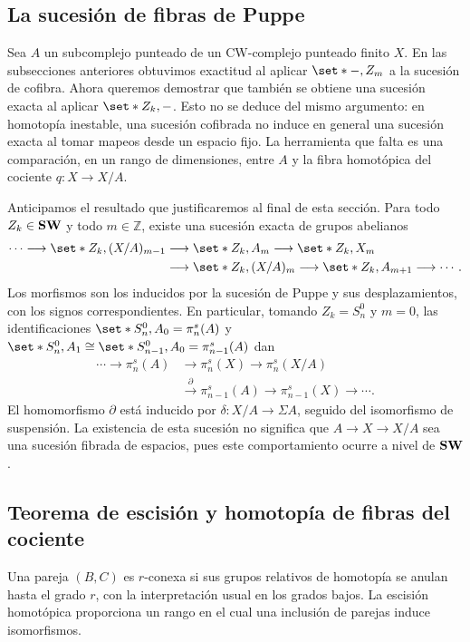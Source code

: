 \subsection{La sucesión de fibras de Puppe}
Sea $A$ un subcomplejo punteado de un CW-complejo punteado finito $X$. En las subsecciones anteriores obtuvimos exactitud al aplicar $\set*{-,Z_m}$ a la sucesión de cofibra. Ahora queremos demostrar que también se obtiene una sucesión exacta al aplicar $\set*{Z_k,-}$. Esto no se deduce del mismo argumento: en homotopía inestable, una sucesión cofibrada no induce en general una sucesión exacta al tomar mapeos desde un espacio fijo. La herramienta que falta es una comparación, en un rango de dimensiones, entre $A$ y la fibra homotópica del cociente $q\colon X\to X/A$.

Anticipamos el resultado que justificaremos al final de esta sección. Para todo $Z_k\in\mathbf{SW}$ y todo $m\in\mathbb Z$, existe una sucesión exacta de grupos abelianos
\[
\begin{aligned}
\cdots\longrightarrow\set*{Z_k,(X/A)_{m-1}}
&\longrightarrow\set*{Z_k,A_m}\longrightarrow\set*{Z_k,X_m}\\
&\longrightarrow\set*{Z_k,(X/A)_m}\longrightarrow\set*{Z_k,A_{m+1}}
\longrightarrow\cdots .
\end{aligned}
\]
Los morfismos son los inducidos por la sucesión de Puppe y sus desplazamientos, con los signos correspondientes. En particular, tomando $Z_k=S^0_n$ y $m=0$, las identificaciones $\set*{S^0_n,A_0}=\pi_n^s(A)$ y $\set*{S^0_n,A_1}\cong\set*{S^0_{n-1},A_0}=\pi_{n-1}^s(A)$ dan
\[
\begin{aligned}
\cdots\longrightarrow\pi_n^s(A)&\longrightarrow\pi_n^s(X)
\longrightarrow\pi_n^s(X/A)\\
&\xrightarrow{\ \partial\ }\pi_{n-1}^s(A)
\longrightarrow\pi_{n-1}^s(X)\longrightarrow\cdots .
\end{aligned}
\]
El homomorfismo $\partial$ está inducido por $\delta\colon X/A\to\Sigma A$, seguido del isomorfismo de suspensión. La existencia de esta sucesión no significa que $A\to X\to X/A$ sea una sucesión fibrada de espacios, pues este comportamiento ocurre a nivel de $\mathbf{SW}$.

\subsection{Teorema de escisión y homotopía de fibras del cociente}
Una pareja $(B,C)$ es $r$-conexa si sus grupos relativos de homotopía se anulan hasta el grado $r$, con la interpretación usual en los grados bajos. La escisión homotópica proporciona un rango en el cual una inclusión de parejas induce isomorfismos.

